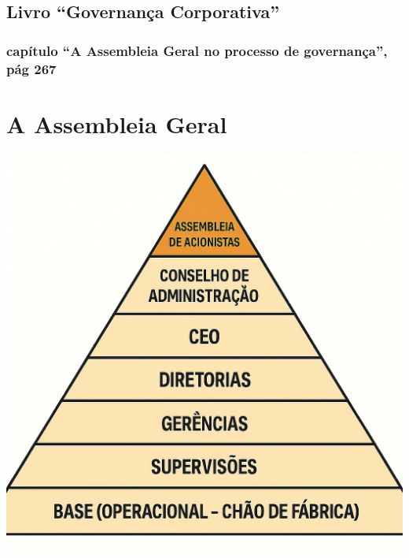 \documentclass[
]{book}
\begin{document}
\subsection{Livro ``Governança Corporativa''}\label{livro-governanuxe7a-corporativa}

\subsubsection{capítulo ``A Assembleia Geral no processo de governança'', pág 267}\label{capuxedtulo-a-assembleia-geral-no-processo-de-governanuxe7a-puxe1g-267}

\section{\texorpdfstring{\textbf{A Assembleia Geral}}{A Assembleia Geral}}\label{a-assembleia-geral}

\includegraphics[width=5.34375in,height=\textheight]{images/03-2025-08-19_20/00-assembleia_cotistas.jpg}
\end{document}
